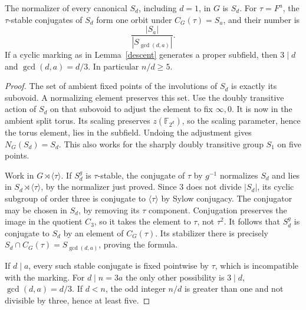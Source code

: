 \documentclass[11pt,a4paper]{article}
\begin{document}
\begin{lemma}\label{subfields}
The normalizer of every canonical $S_d$, including $d=1$, in $G$ is $S_d$.
For $\tau=F^a$, the $\tau$-stable conjugates of $S_d$ form one orbit under
$C_G(\tau)=S_a$, and their number is
\[
 \frac{|S_a|}{|S_{\gcd(d,a)}|}.
\]
If a cyclic marking as in Lemma~\ref{descent} generates a proper subfield,
then $3\mid d$ and $\gcd(d,a)=d/3$. In particular $n/d\ge5$.
\end{lemma}
\begin{proof}
The set of ambient fixed points of the involutions of $S_d$ is exactly
its subovoid. A normalizing element preserves this set. Use the doubly
transitive action of $S_d$ on that subovoid to adjust the element to fix
$\infty,0$. It is now in the ambient split torus. Its scaling preserves
$z(\mathbb F_{2^d})$, so the scaling parameter, hence the torus element,
lies in the subfield. Undoing the adjustment gives $N_G(S_d)=S_d$.
This also works for the sharply doubly transitive group $S_1$ on five points.

Work in $G\rtimes\langle\tau\rangle$. If $S_d^g$ is $\tau$-stable,
the conjugate of $\tau$ by $g^{-1}$ normalizes $S_d$ and lies in
$S_d\rtimes\langle\tau\rangle$, by the normalizer just proved.
Since $3$ does not divide $|S_d|$, its cyclic subgroup of order three is
conjugate to $\langle\tau\rangle$ by Sylow conjugacy. The conjugator may
be chosen in $S_d$, by removing its $\tau$ component. Conjugation preserves
the image in the quotient $C_3$, so it takes the element to $\tau$, not
$\tau^2$. It follows that $S_d^g$ is conjugate to $S_d$ by an element of
$C_G(\tau)$. Its stabilizer there is precisely
$S_d\cap C_G(\tau)=S_{\gcd(d,a)}$, proving the formula.

If $d\mid a$, every such stable conjugate is fixed pointwise by $\tau$,
which is incompatible with the marking. For $d\mid n=3a$ the only other
possibility is $3\mid d$, $\gcd(d,a)=d/3$. If $d<n$, the odd integer
$n/d$ is greater than one and not divisible by three, hence at least five.
\end{proof}
\end{document}
